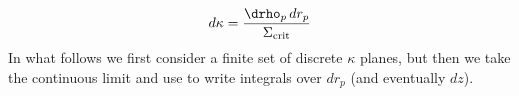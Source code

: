\begin{equation}
\label{eq:dkappa1}
  d\kappa = \frac{\drho_p\,dr_p}{\Sigma_{\rm crit}}
 \end{equation}
In what follows we first consider a finite set of discrete $\kappa$ planes, but then we take the continuous limit and use  to write integrals over $dr_p$ (and eventually $dz$).
